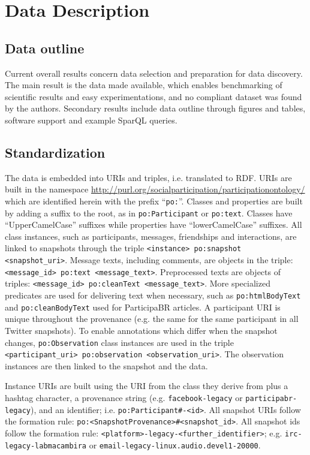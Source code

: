 \documentclass[journal,article,submit,moreauthors,pdftex]{Definitions/mdpi}
\newcommand{\textttt}[1] {\texttt{\footnotesize#1}}
\begin{document}
\section{Data Description}\label{materials}
\subsection{Data outline}




\label{outline}
Current overall results concern data selection and preparation for data discovery.
The main result is the data made available, which enables benchmarking of scientific results
and easy experimentations, and no compliant dataset was found by the authors.
Secondary results include data outline through figures and tables,
software support and example SparQL queries.

\subsection{Standardization}
The data is embedded into URIs and triples, i.e. translated to RDF.
URIs are built in the namespace \url{http://purl.org/socialparticipation/participationontology/}
which are identified herein with the prefix ``\textttt{po:}''.
Classes and properties are built by adding a suffix to the root, as in \textttt{po:Participant} or \textttt{po:text}.
Classes have ``UpperCamelCase'' suffixes while properties have ``lowerCamelCase'' suffixes.
All class instances, such as participants, messages, friendships and
interactions, are linked to
snapshots through the triple \textttt{<instance> po:snapshot <snapshot\_uri>}.
Message texts, including comments, are objects in the triple: \textttt{<message\_id> po:text <message\_text>}.
Preprocessed texts are objects of triples: \textttt{<message\_id> po:cleanText <message\_text>}.
More specialized predicates are used for delivering text when necessary,
such as \textttt{po:htmlBodyText} and \textttt{po:cleanBodyText} used
for ParticipaBR articles.
A participant URI is unique throughout the provenance (e.g. the same for
the same participant in all Twitter snapshots).
To enable annotations which differ when the snapshot changes,
\texttt{po:Observation} class instances are used in the triple
\textttt{<participant\_uri> po:observation <observation\_uri>}.
The observation instances are then linked to the snapshot and the
data.

Instance URIs are built using the URI from the class they derive from plus a hashtag character,
a provenance string (e.g. \textttt{facebook-legacy} or
\textttt{participabr-legacy}), and an identifier;
i.e. \textttt{po:Participant\#<provenance-legacy>-<id>}.
All snapshot URIs follow the formation rule: \textttt{po:<SnapshotProvenance>\#<snapshot\_id>}.
All snapshot ids follow the formation rule: \textttt{<platform>-legacy-<further\_identifier>}; e.g.
\textttt{irc-legacy-labmacambira} or
\textttt{email-legacy-linux.audio.devel1-20000}.
\end{document}
